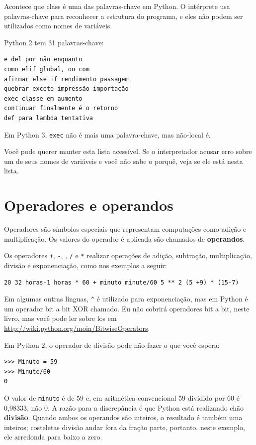 \documentclass[10pt]{book}
\begin{document}
Acontece que {class \tt} é uma das palavras-chave {\bf} em Python. O
intérprete usa palavras-chave para reconhecer a estrutura do programa,
e eles não podem ser utilizados como nomes de variáveis.

Python 2 tem 31 palavras-chave:

\begin{verbatim}
e del por não enquanto    
como elif global, ou com     
afirmar else if rendimento passagem    
quebrar exceto impressão importação              
exec classe em aumento              
continuar finalmente é o retorno             
def para lambda tentativa
\end{verbatim}
%
Em Python 3, {\tt exec} não é mais uma palavra-chave, mas {\tt} não-local é.

Você pode querer manter esta lista acessível. Se o interpretador acusar erro
sobre um de seus nomes de variáveis ​​e você não sabe o porquê, veja se ele
está nesta lista.


\section{Operadores e operandos}

{Operadores \bf} são símbolos especiais que representam computações como
adição e multiplicação. Os valores do operador é aplicada
são chamados de {\bf operandos}.

Os operadores {\tt +}, {\tt -}, {\tt *}, {\tt /} e {\tt **}
realizar operações de adição, subtração, multiplicação, divisão e
exponenciação, como nos exemplos a seguir:

\begin{verbatim}
20 32 horas-1 horas * 60 + minuto minute/60 5 ** 2 (5 +9) * (15-7)
\end{verbatim}
%
Em algumas outras línguas, \verb "^" é utilizado para exponenciação, mas
em Python é um operador bit a bit XOR chamado. Eu não cobrirá
operadores bit a bit, neste livro, mas você pode ler sobre
los em \url{http://wiki.python.org/moin/BitwiseOperators}.

Em Python 2, o operador de divisão pode não fazer o que você espera:

\begin{verbatim}
>>> Minuto = 59
>>> Minute/60
0
\end{verbatim}
%
O valor de {\tt minuto} é de 59 e, em aritmética convencional 59
dividido por 60 é 0,98333, não 0. A razão para a discrepância é
que Python está realizando {chão \bf divisão}.
Quando ambos os operandos são inteiros, o resultado é também uma
inteiros; costeletas divisão andar fora da fração
parte, portanto, neste exemplo, ele arredonda para baixo a zero.
\end{document}
